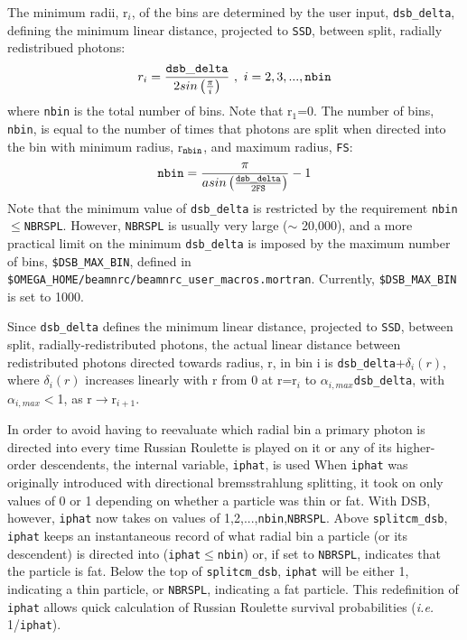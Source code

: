 \documentclass[12pt,twoside]{article}
\begin{document}
The minimum radii, r$_i$, of the bins are determined by the user input, {\tt dsb\_delta}, defining the minimum
linear distance, projected to {\tt SSD}, between split, radially redistribued photons:
\begin{equation}
r_i=\frac{\tt dsb\_delta}{2sin\left(\frac{\pi}{i}\right)}~,~ i=2,3,...,{\tt nbin}
\label{rieqn}
\end{equation}
where {\tt nbin} is the total number of bins.  Note that r$_1$=0.  The number of bins, {\tt nbin}, is equal
to the number of times that photons are split when directed into the bin with minimum radius, r$_{\tt nbin}$,
and maximum radius, {\tt FS}:
\begin{equation}
{\tt nbin}=\frac{\pi}{asin\left(\frac{\tt dsb\_delta}{2{\tt FS}}\right)}-1
\label{nbineqn}
\end{equation}
Note that the minimum value of {\tt dsb\_delta} is restricted by the requirement {\tt nbin}$\leq${\tt NBRSPL}.
However, {\tt NBRSPL} is usually very large ($\sim$ 20,000), and a more practical limit on the minimum
{\tt dsb\_delta} is imposed by the maximum number of bins, {\tt \$DSB\_MAX\_BIN}, defined in
{\tt \$OMEGA\_HOME/beamnrc/beamnrc\_user\_macros.mortran}.  Currently, {\tt \$DSB\_MAX\_BIN} is set to
1000.

Since {\tt dsb\_delta} defines the minimum linear distance, projected to {\tt SSD}, between split, radially-redistributed photons, the actual linear distance between redistributed photons directed towards radius, r, in bin i is
{\tt dsb\_delta}+$\delta_i(r)$, where $\delta_i(r)$ increases linearly with r from 0 at r=r$_i$ to
$\alpha_{i,max}${\tt dsb\_delta}, with $\alpha_{i,max}<$1, as r$\rightarrow$r$_{i+1}$.

In order to avoid having to reevaluate which radial bin a primary photon is directed into every time Russian
Roulette is played on it or any of its higher-order descendents, the internal variable, {\tt iphat}, is used
When {\tt iphat} was originally introduced with directional bremsstrahlung splitting, it took on only values of 0 or 1
depending on whether a particle was thin
or fat.  With DSB, however, {\tt iphat} now takes on values of 1,2,...,{\tt nbin},{\tt NBRSPL}.
Above {\tt splitcm\_dsb}, {\tt iphat} keeps an instantaneous record of what radial bin a particle (or its descendent)
is directed into ({\tt iphat}$\leq${\tt nbin}) or, if set to {\tt NBRSPL}, indicates that the particle is fat.
Below the top of {\tt splitcm\_dsb}, {\tt iphat} will be either 1, indicating a thin particle, or {\tt NBRSPL}, indicating a fat particle.  This redefinition of {\tt iphat} allows quick calculation of Russian Roulette survival
probabilities ({\em i.e.} 1/{\tt iphat}).
\end{document}
